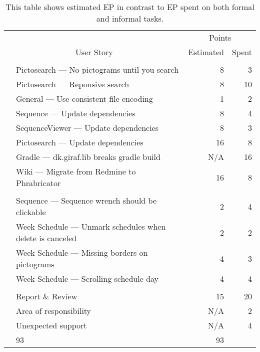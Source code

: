 \begin{table}[!htbp]
\small
\centering
    \begin{tabular}{llrr}
        && \multicolumn{2}{c}{Points}                                                          \\
        \cline{3-4}
        \multicolumn{2}{c}{User Story}		                         & Estimated & Spent \\
        \midrule
        \tblgrpsep
        \multicolumn{2}{l}{Formal tasks}							                     \\
        \cline{1-2}
        &Pictosearch --- No pictograms until you search             & 8          & 3    \\
        &Pictosearch --- Reponsive search                           & 8          & 10   \\
        &General --- Use consistent file encoding                    & 1          & 2    \\
        &Sequence --- Update dependencies                            & 8          & 4    \\
        &SequenceViewer --- Update dependencies                      & 8          & 3    \\
        &Pictosearch --- Update dependencies                        & 16         & 8    \\
        &Gradle --- dk.giraf.lib breaks gradle build                 & N/A        & 16   \\
        &Wiki --- Migrate from Redmine to Phrabricator               & 16         & 8    \\
        \tblgrpsep
        \multicolumn{2}{l}{Extra tasks}									                 \\
        \cline{1-2}
        &Sequence --- Sequence wrench should be clickable            & 2          & 4    \\
        &Week Schedule --- Unmark schedules when delete is canceled  & 2          & 2    \\
        &Week Schedule --- Missing borders on pictograms             & 4          & 3    \\
        &Week Schedule --- Scrolling schedule day                    & 4          & 4    \\
        \tblgrpsep
        \multicolumn{2}{l}{Informal tasks}									             \\
        \cline{1-2}
        &Report \& Review                                            & 15         & 20   \\
        &Area of responsibility                                      & N/A        & 2    \\
        &Unexpected support                                          & N/A        & 4    \\
        \tblgrpsep
        \midrule
        \multicolumn{2}{l}{Total}                                    & 93         & 93   \\
    \end{tabular}
    \caption{This table shows estimated EP in contrast to EP spent on both formal and informal tasks.}\label{tab:sprint1tasktable}
\end{table}
